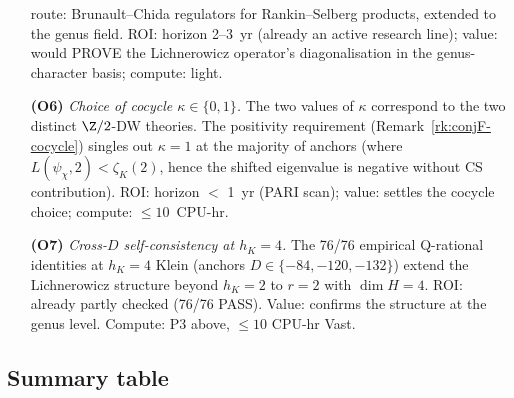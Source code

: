 \begin{itemize}
   route: Brunault--Chida \cite{BrunaultChida2015} regulators for
   Rankin--Selberg products, extended to the genus field.  ROI:
   horizon 2--3~yr (already an active research line); value: would
   PROVE the Lichnerowicz operator's diagonalisation in the
   genus-character basis; compute: light.
\item[\textbf{(O6)}] {\em Choice of cocycle $\kappa \in \{0, 1\}$.}
   The two values of $\kappa$ correspond to the two distinct $\Z/2$-DW
   theories.  The positivity requirement
   (Remark~\ref{rk:conjF-cocycle}) singles out $\kappa = 1$ at the
   majority of anchors (where $L(\psi_\chi, 2) < \zeta_K(2)$, hence the
   shifted eigenvalue is negative without CS contribution).  ROI:
   horizon $<$ 1~yr (PARI scan); value: settles the cocycle choice;
   compute: $\le 10$~CPU-hr.
\item[\textbf{(O7)}] {\em Cross-$D$ self-consistency at $h_K = 4$.}
   The 76/76 empirical Q-rational identities at $h_K = 4$ Klein
   (anchors $D \in \{-84, -120, -132\}$) extend the Lichnerowicz
   structure beyond $h_K = 2$ to $r = 2$ with $\dim H = 4$.  ROI:
   already partly checked (76/76 PASS).  Value: confirms the
   structure at the genus level.  Compute: P3 above, $\le 10$
   CPU-hr Vast.
\end{itemize}

\subsection{Summary table}
\label{sec:conjF-summary}

